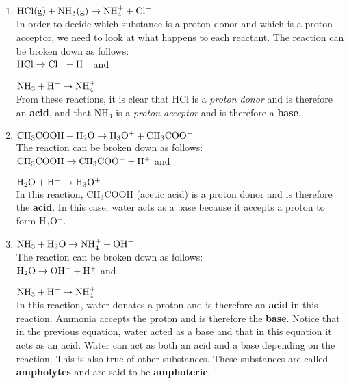 \begin{enumerate}
\item{$\rm{HCl(g) + NH_{3}(g) \rightarrow NH_{4}^{+} + Cl^{-}}$\\

In order to decide which substance is a proton donor and which is a proton acceptor, we need to look at what happens to each reactant. The reaction can be broken down as follows:\\

$\rm{HCl \rightarrow Cl^{-} + H^{+}}$ and

$\rm{NH_{3} + H^{+} \rightarrow NH_{4}^{+}}$\\

From these reactions, it is clear that HCl is a \textit{proton donor} and is therefore an \textbf{acid}, and that NH$_{3}$ is a \textit{proton acceptor} and is therefore a \textbf{base}.
}

\item{$\rm{CH_{3}COOH + H_{2}O \rightarrow H_{3}O^{+} + CH_{3}COO^{-}}$\\

The reaction can be broken down as follows:\\

$\rm{CH_{3}COOH \rightarrow CH_{3}COO^{-} + H^{+}}$ and

$\rm{H_{2}O + H^{+} \rightarrow H_{3}O^{+}}$\\

In this reaction, CH$_{3}$COOH (acetic acid) is a proton donor and is therefore the \textbf{acid}. In this case, water acts as a base because it accepts a proton to form H$_{3}$O$^{+}$.
}

\item{$\rm{NH_{3} + H_{2}O \rightarrow NH_{4}^{+} + OH^{-}}$\\

The reaction can be broken down as follows:\\

$\rm{H_{2}O \rightarrow OH^{-} + H^{+}}$ and

$\rm{NH_{3} + H^{+} \rightarrow NH_{4}^{+}}$\\

In this reaction, water donates a proton and is therefore an \textbf{acid} in this reaction. Ammonia accepts the proton  and is therefore the \textbf{base}. Notice that in the previous equation, water acted as a base and that in this equation it acts as an acid. Water can act as both an acid and a base depending on the reaction. This is also true of other substances. These substances are called \textbf{ampholytes} and are said to be \textbf{amphoteric}.}
\end{enumerate}

